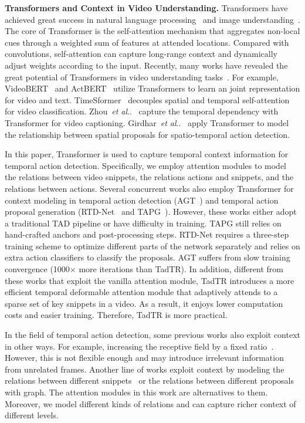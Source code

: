 \documentclass[lettersize,journal]{IEEEtran}
\makeatletter
\DeclareRobustCommand\onedot{\futurelet\@let@token\@onedot}
\def\@onedot{\ifx\@let@token.\else.\null\fi\xspace}
\def\etal{\emph{et al}\onedot}
\makeatother
\begin{document}
\vspace{1ex}\noindent\textbf{Transformers and Context in Video Understanding.}
Transformers have achieved great success in natural language processing~\cite{vaswani2017attention} and image understanding~\cite{tan2021planetr,chen2022transmix,liang2022transcrowd}. The core of Transformer is the self-attention mechanism that aggregates non-local cues through a weighted sum of features at attended locations. Compared with convolutions, self-attention can capture long-range context and dynamically adjust weights according to the input. Recently, many works have revealed the great potential of Transformers in video understanding tasks~\cite{sun2019videobert,bertasius2021space,wu2021seqformer}.
For example, VideoBERT~\cite{sun2019videobert} and ActBERT~\cite{zhu2020actbert} utilize Transformers to learn an joint representation for video and text. TimeSformer~\cite{bertasius2021space} decouples spatial and temporal self-attention for video classification. Zhou~\etal~\cite{zhou2018end} capture the temporal dependency with Transformer for video captioning.
Girdhar~\etal~\cite{girdhar2019video} apply Transformer to model the relationship between spatial proposals for spatio-temporal action detection.

In this paper, Transformer is used to capture temporal context information for temporal action detection.  Specifically, we employ attention modules to model the relations between video snippets, the relations actions and snippets, and the relations between actions. Several concurrent works also employ Transformer for context modeling in temporal action detection (AGT~\cite{nawhal2021activity}) and temporal action proposal generation (RTD-Net~\cite{tan2021relaxed} and TAPG~\cite{wang2021temporal}). 
However, these works either adopt a traditional TAD pipeline or have difficulty in training.
TAPG still relies on hand-crafted anchors and post-processing steps.  
RTD-Net requires a three-step training scheme to optimize different parts of the network separately and relies on extra action classifiers to classify the proposals. AGT suffers from slow training convergence (1000$\times$ more iterations than TadTR).
In addition, different from these works that exploit the vanilla attention module, TadTR introduces a more efficient temporal deformable attention module that adaptively attends to a sparse set of key snippets in a video. As a result, it enjoys lower computation costs and easier training. Therefore, TadTR is more practical. 

In the field of temporal action detection, some previous works also exploit context in other ways. For example, increasing the receptive field by a fixed ratio~\cite{chao2018rethinking,dai2017temporal}. However, this is not flexible enough and may introduce irrelevant information from unrelated frames.
Another line of works exploit context by modeling the relations between different snippets~\cite{xu2020g,bai2020boundary} or the relations between different proposals~\cite{zeng2019graph} with graph. The attention modules in this work are alternatives to them. Moreover, we model different kinds of relations and can capture richer context of different levels.
\end{document}
